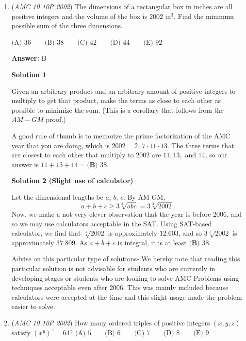 \begin{enumerate}
 Thus, our answer is $\boxed{\textbf{(D) } 1250 - \frac{x^2}{2}}.$



	\item (\textit{AMC 10 10P 2002}) The dimensions of a rectangular box in inches are all positive integers and the volume of the box is $2002$ in$^3$. Find the minimum possible sum of the three dimensions.


 $\text{(A) }36 \qquad \text{(B) }38  \qquad \text{(C) }42 \qquad \text{(D) }44 \qquad \text{(E) }92$

 \textbf{Answer: }B



\textbf{Solution 1}

Given an arbitrary product and an arbitrary amount of positive integers to multiply to get that product, make the terms as close to each other as possible to minimize the sum. (This is a corollary that follows from the $AM-GM$ proof.) 

 A good rule of thumb is to memorize the prime factorization of the AMC year that you are doing, which is $2002= 2 \cdot 7 \cdot 11 \cdot 13$. The three terms that are closest to each other that multiply to $2002$ are $11, 13,$ and $14$, so our answer is $11+13+14=\boxed{\textbf{(B) } 38}$.

 



\textbf{Solution 2 (Slight use of calculator)}

Let the dimensional lengths be $a$, $b$, $c$. By AM-GM,
 \[a+b+c\ge3\sqrt[3]{abc}=3\sqrt[3]{2002}.\]Now, we make a not-very-clever observation that the year is before 2006, and so we may use calculators acceptable in the SAT. Using SAT-based calculator, we find that $\sqrt[3]{2002}$ is approximately $12.603$, and so $3\sqrt[3]{2002}$ is approximately $37.809$. As $a+b+c$ is integral, it is at least $\boxed{\textbf{(B) } 38}$.

 Advise on this particular type of solutions- We hereby note that reading this particular solution is not advisable for students who are currently in developing stages or students who are looking to solve AMC Problems using techniques acceptable even after 2006. This was mainly included because calculators were accepted at the time and this slight usage made the problem easier to solve.

 


	\item (\textit{AMC 10 10P 2002}) How many ordered triples of positive integers $(x,y,z)$ satisfy $(x^y)^z=64?$
$\text{(A) }5 \qquad \text{(B) }6 \qquad \text{(C) }7 \qquad \text{(D) }8 \qquad \text{(E) }9$


\end{enumerate}
